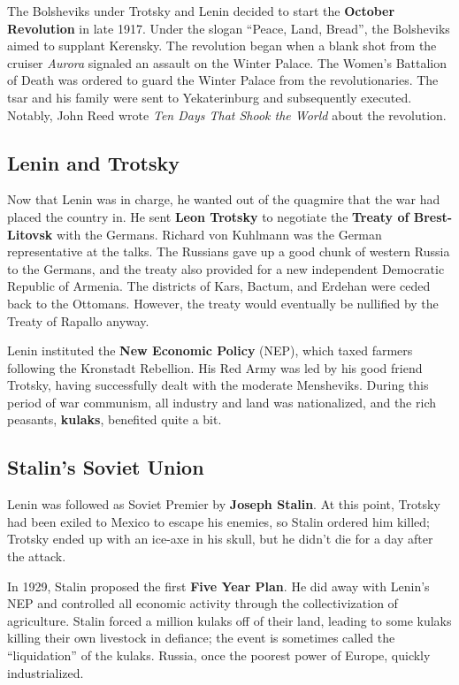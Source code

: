 The Bolsheviks under Trotsky and Lenin decided to start the \textbf{October Revolution} in late 1917.
Under the slogan ``Peace, Land, Bread'', the Bolsheviks aimed to supplant Kerensky.
The revolution began when a blank shot from the cruiser \textit{Aurora} signaled an assault on the Winter Palace.
The Women's Battalion of Death was ordered to guard the Winter Palace from the revolutionaries.
The tsar and his family were sent to Yekaterinburg and subsequently executed.
Notably, John Reed wrote \textit{Ten Days That Shook the World} about the revolution.

\subsection*{Lenin and Trotsky}

Now that Lenin was in charge, he wanted out of the quagmire that the war had placed the country in.
He sent \textbf{Leon Trotsky} to negotiate the \textbf{Treaty of Brest-Litovsk} with the Germans.
Richard von Kuhlmann was the German representative at the talks.
The Russians gave up a good chunk of western Russia to the Germans,
and the treaty also provided for a new independent Democratic Republic of Armenia.
The districts of Kars, Bactum, and Erdehan were ceded back to the Ottomans.
However, the treaty would eventually be nullified by the Treaty of Rapallo anyway.

Lenin instituted the \textbf{New Economic Policy} (NEP), which taxed farmers following the Kronstadt Rebellion.
His Red Army was led by his good friend Trotsky, having successfully dealt with the moderate Mensheviks.
During this period of war communism, all industry and land was nationalized,
and the rich peasants, \textbf{kulaks}, benefited quite a bit.

\subsection*{Stalin's Soviet Union}

Lenin was followed as Soviet Premier by \textbf{Joseph Stalin}.
At this point, Trotsky had been exiled to Mexico to escape his enemies, so Stalin ordered him killed;
Trotsky ended up with an ice-axe in his skull, but he didn't die for a day after the attack.

In 1929, Stalin proposed the first \textbf{Five Year Plan}.
He did away with Lenin's NEP and controlled all economic activity through the collectivization of agriculture.
Stalin forced a million kulaks off of their land, leading to some kulaks killing their own livestock in defiance;
the event is sometimes called the ``liquidation'' of the kulaks.
Russia, once the poorest power of Europe, quickly industrialized.

